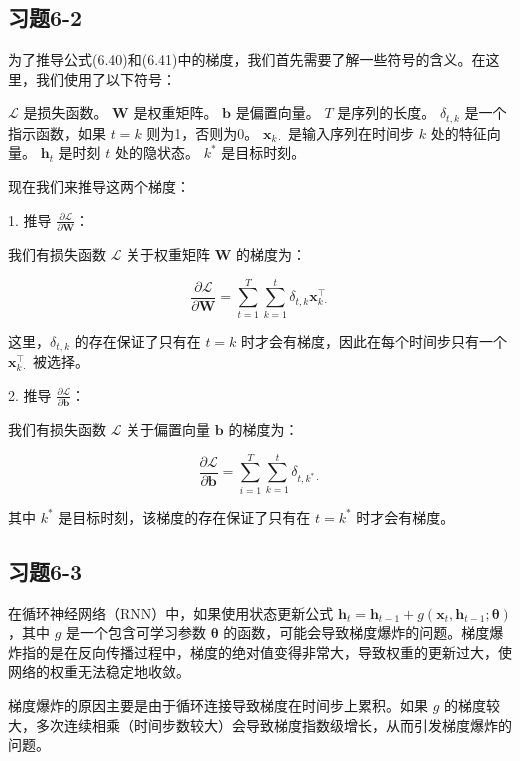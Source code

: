 \documentclass[]{article}
\begin{document}
\subsection{习题6-2}
为了推导公式(6.40)和(6.41)中的梯度，我们首先需要了解一些符号的含义。在这里，我们使用了以下符号：

\( \mathcal{L} \) 是损失函数。
\( \boldsymbol{W} \) 是权重矩阵。
\( \boldsymbol{b} \) 是偏置向量。
\( T \) 是序列的长度。
\( \delta_{t, k} \) 是一个指示函数，如果 \( t = k \) 则为1，否则为0。
\( \boldsymbol{x}_{k\cdot} \) 是输入序列在时间步 \( k \) 处的特征向量。
\( \boldsymbol{h}_t \) 是时刻 \( t \) 处的隐状态。
\( k^* \) 是目标时刻。

现在我们来推导这两个梯度：

1. 推导 \( \frac{\partial \mathcal{L}}{\partial \boldsymbol{W}} \)：

我们有损失函数 \( \mathcal{L} \) 关于权重矩阵 \( \boldsymbol{W} \) 的梯度为：

\[ \frac{\partial \mathcal{L}}{\partial \boldsymbol{W}} = \sum_{t=1}^T \sum_{k=1}^t \delta_{t, k} \boldsymbol{x}_{k\cdot}^{\top} \]

这里，\( \delta_{t, k} \) 的存在保证了只有在 \( t = k \) 时才会有梯度，因此在每个时间步只有一个 \( \boldsymbol{x}_{k\cdot}^{\top} \) 被选择。

2. 推导 \( \frac{\partial \mathcal{L}}{\partial \boldsymbol{b}} \)：

我们有损失函数 \( \mathcal{L} \) 关于偏置向量 \( \boldsymbol{b} \) 的梯度为：

\[ \frac{\partial \mathcal{L}}{\partial \boldsymbol{b}} = \sum_{i=1}^T \sum_{k=1}^t \delta_{t, k^* \cdot} \]

其中 \( k^* \) 是目标时刻，该梯度的存在保证了只有在 \( t = k^* \) 时才会有梯度。

\subsection{习题6-3}
在循环神经网络（RNN）中，如果使用状态更新公式 \( \boldsymbol{h}_t = \boldsymbol{h}_{t-1} + g(\boldsymbol{x}_t, \boldsymbol{h}_{t-1}; \boldsymbol{\theta}) \)，其中 \( g \) 是一个包含可学习参数 \(\boldsymbol{\theta}\) 的函数，可能会导致梯度爆炸的问题。梯度爆炸指的是在反向传播过程中，梯度的绝对值变得非常大，导致权重的更新过大，使网络的权重无法稳定地收敛。

梯度爆炸的原因主要是由于循环连接导致梯度在时间步上累积。如果 \( g \) 的梯度较大，多次连续相乘（时间步数较大）会导致梯度指数级增长，从而引发梯度爆炸的问题。
\end{document}
